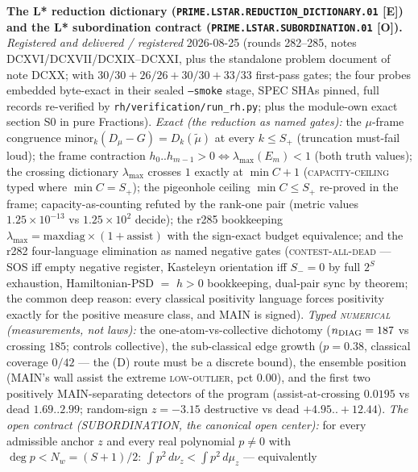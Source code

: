 \documentclass[11pt,a4paper]{article}
\begin{document}
\par\smallskip\noindent\textbf{The L* reduction dictionary
(\texttt{PRIME.LSTAR.\allowbreak REDUCTION\_DICTIONARY.01} [E])
and the L* subordination contract
(\texttt{PRIME.LSTAR.\allowbreak SUBORDINATION.01} [O]).}
{\sloppy
\emph{Registered and delivered / registered} 2026-08-25 (rounds
282--285, notes DCXVI/DCXVII/DCXIX--DCXXI, plus the standalone
problem document of note DCXX;
 with $30/30 + 26/26
+ 30/30 + 33/33$ first-pass gates; the four probes embedded
byte-exact in their sealed \texttt{--smoke} stage, SPEC SHAs
pinned, full records re-verified by
\texttt{rh/verification/run\_rh.py}; plus the module-own exact
section S0 in pure Fractions).  \emph{Exact (the reduction as
named gates):} the $\mu$-frame congruence
$\mathrm{minor}_k(D_\mu - G) = D_k(\tilde\mu)$ at every $k \le
S_+$ (truncation must-fail loud); the frame contraction
$h_0..h_{m-1} > 0 \iff \lambda_{\max}(E_m) < 1$ (both truth
values); the crossing dictionary $\lambda_{\max}$ crosses $1$
exactly at $\min C + 1$ (\textsc{capacity-ceiling} typed where
$\min C = S_+$); the pigeonhole ceiling $\min C \le S_+$
re-proved in the frame; capacity-as-counting refuted by the
rank-one pair (metric values $1.25\times10^{-13}$ vs
$1.25\times10^{2}$ decide); the r285 bookkeeping
$\lambda_{\max} = \mathrm{maxdiag}\times(1 + \mathrm{assist})$
with the sign-exact budget equivalence; and the r282
four-language elimination as named negative gates
(\textsc{contest-all-dead} --- SOS iff empty negative register,
Kasteleyn orientation iff $S_- = 0$ by full $2^S$ exhaustion,
Hamiltonian-PSD $=$ $h > 0$ bookkeeping, dual-pair sync by
theorem; the common deep reason: every classical positivity
language forces positivity exactly for the positive measure
class, and MAIN is signed).  \emph{Typed \textsc{numerical}
(measurements, not laws):} the one-atom-vs-collective dichotomy
($n_{\rm DIAG} = 187$ vs crossing $185$; controls collective),
the sub-classical edge growth ($p = 0.38$, classical coverage
$0/42$ --- the (D) route must be a discrete bound), the ensemble
position (MAIN's wall assist the extreme \textsc{low-outlier},
pct $0.00$), and the first two positively MAIN-separating
detectors of the program (assist-at-crossing $0.0195$ vs dead
$1.69..2.99$; random-sign $z = -3.15$ destructive vs dead
$+4.95..+12.44$).  \emph{The open contract (SUBORDINATION, the
canonical open center):} for every admissible anchor $z$ and
every real polynomial $p \ne 0$ with $\deg p < N_w = (S+1)/2$:
$\int p^2\,d\nu_z < \int p^2\,d\mu_z$ --- equivalently
}
\end{document}
